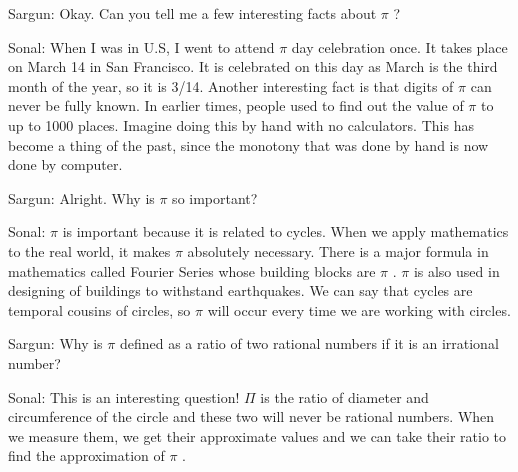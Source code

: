 \documentclass[12pt]{article}
\begin{document}
\begin{justify}
Sargun: Okay. Can you tell me a few interesting facts about $ \pi $ ?
\end{justify}\par

\begin{justify}
Sonal: When I was in U.S, I went to attend $ \pi $  day celebration once. It takes place on March 14 in San Francisco. It is celebrated on this day as March is the third month of the year, so it is 3/14. Another interesting fact is that digits of $ \pi $  can never be fully known. In earlier times, people used to find out the value of $ \pi $  to up to 1000 places. Imagine doing this by hand with no calculators. This has become a thing of the past, since the monotony that was done by hand is now done by computer.
\end{justify}\par

\begin{justify}
Sargun: Alright. Why is $ \pi $  so important?
\end{justify}\par

\begin{justify}
Sonal: $ \pi $  is important because it is related to cycles. When we apply mathematics to the real world, it makes $ \pi $  absolutely necessary. There is a major formula in mathematics called Fourier Series whose building blocks are $ \pi $ . $ \pi $  is also used in designing of buildings to withstand earthquakes. We can say that cycles are temporal cousins of circles, so $ \pi $  will occur every time we are working with circles. 
\end{justify}\par


\vspace{\baselineskip}
\begin{justify}
Sargun: Why is $ \pi $  defined as a ratio of two rational numbers if it is an irrational number?
\end{justify}\par

\begin{justify}
Sonal: This is an interesting question! $ \Pi $  is the ratio of diameter and circumference of the circle and these two will never be rational numbers. When we measure them, we get their approximate values and we can take their ratio to find the approximation of $ \pi $ .
\end{justify}\par
\end{document}
